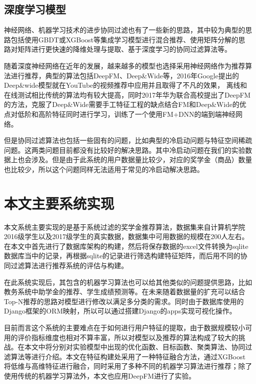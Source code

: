 \subsection{深度学习模型}

神经网络、机器学习技术的进步协同过滤也有了一些新的思路，其中较为典型的思路包括使用GBDT或XGBoost等集成学习模型进行混合推荐、使用矩阵分解的思路对矩阵进行更快速的降维处理与提取、基于深度学习的协同过滤算法等。

随着深度神经网络在近年的发展，越来越多的模型也选择采用神经网络作为推荐算法进行推荐，典型的算法包括DeepFM、Deep\&Wide等，2016年Google提出的Deep\&wide模型就在YouTube的视频推荐中应用并且取得了不凡的效果，
离线和在线测试相比传统的算法均有较大提高，同时2017年华为联合高校提出了DeepFM的方法，克服了Deep\&Wide需要手工特征工程的缺点结合FM和Deep\&Wide的优点对低阶和高阶特征同时进行学习，训练了一个使用FM+DNN的端到端神经网络。

但是协同过滤算法也包括一些固有的问题，比如典型的冷启动问题与特征空间稀疏问题。这两类问题目前都没有比较好的解决思路。其中冷启动问题在我们的实验数据上也会涉及。但是由于此系统的用户数据量比较少，对应的奖学金（商品）数量也比较少，所以这个问题同样无法适用于常见的冷启动解决思路。

\section{本文主要系统实现}

本文系统主要实现的是基于系统过滤的奖学金推荐算法，数据集来自计算机学院2016级学生以及2017级学生的真实数据，数据集中可用数据的规模在200人左右。在本文中首先进行了数据库架构的构建，然后将保存数据的excel文件转换为sqlite数据库当中的记录，再根据sqlite的记录进行筛选构建特征矩阵，而后用不同的协同过滤算法进行推荐系统的评估与构建。

在此系统实现后，其包含的机器学习算法也可以给其他类似的问题提供思路，比如教务系统中助学金的推荐、学生成绩预测等。在未来随着数据量的扩充可以结合Top-N推荐的思路对模型进行修改以满足多分类的需求。同时由于数据库使用的Django框架的ORM映射，所以可以通过搭建Django的apps实现可视化操作。

目前而言这个系统的主要难点在于如何进行用户特征的提取，由于数据规模较小可用的评价指标维度也相对不算丰富，所以对模型以及推荐的算法构成了较大的挑战。在本文中将分别对实验模型中出现的优化函数、目标函数、聚类算法、协同过滤算法等进行介绍。本文在特征构建处采用了一种特征融合方法，通过XGBoost将低维与高维特征进行融合，同时采用了多种不同的机器学习算法进行推荐；除了使用传统的机器学习算法外，本文也应用DeepFM进行了实验。

